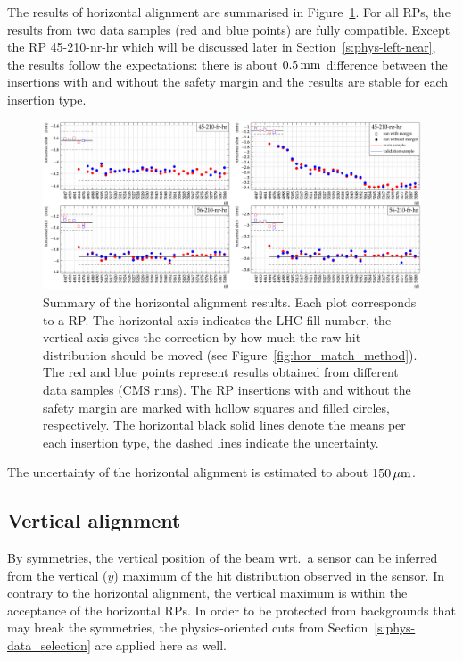 \documentclass[TOTEM]{cern/cernphprep}
\def\un#1{\,{\rm #1}}
\begin{document}
The results of horizontal alignment are summarised in Figure~\ref{fig:hor_match_results}. For all RPs, the results from two data samples (red and blue points) are fully compatible. Except the RP 45-210-nr-hr which will be discussed later in Section~\ref{s:phys-left-near}, the results follow the expectations: there is about $0.5\un{mm}$ difference between the insertions with and without the safety margin and the results are stable for each insertion type.

\begin{figure}[h!]
\begin{center}
\includegraphics[width=\hsize]{fig/physics_fills/final_alignment_x_cmp_ph_sample.pdf}
\caption{%
Summary of the horizontal alignment results. Each plot corresponds to a RP. The horizontal axis indicates the LHC fill number, the vertical axis gives the correction by how much the raw hit distribution should be moved (see Figure~\ref{fig:hor_match_method}). The red and blue points represent results obtained from different data samples (CMS runs). The RP insertions with and without the safety margin are marked with hollow squares and filled circles, respectively. The horizontal black solid lines denote the means per each insertion type, the dashed lines indicate the uncertainty.
}
\label{fig:hor_match_results}
\end{center}
\end{figure}

The uncertainty of the horizontal alignment is estimated to about $150\un{\mu m}$.


\subsection{Vertical alignment}
\label{s:phys-vertical}

By symmetries, the vertical position of the beam wrt.~a sensor can be inferred from the vertical ($y$) maximum of the hit distribution observed in the sensor. In contrary to the horizontal alignment, the vertical maximum is within the acceptance of the horizontal RPs. In order to be protected from backgrounds that may break the symmetries, the physics-oriented cuts from Section~\ref{s:phys-data_selection} are applied here as well.
\end{document}

